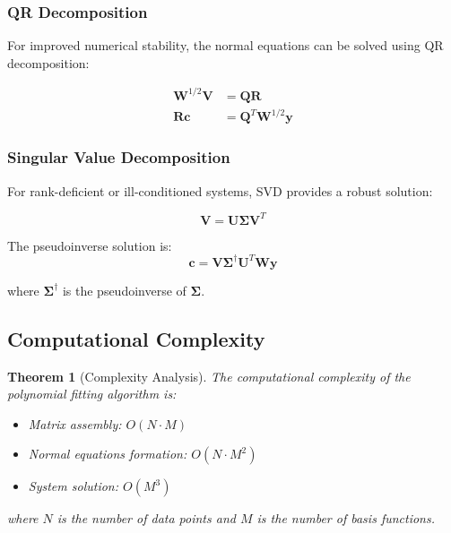 \documentclass[12pt]{article}
\renewcommand{\vec}[1]{\mathbf{#1}}
\newtheorem{theorem}{Theorem}[section]
\begin{document}
\subsubsection{QR Decomposition}

For improved numerical stability, the normal equations can be solved using QR decomposition:

\begin{align}
    \mathbf{W}^{1/2} \mathbf{V} & = \mathbf{Q} \mathbf{R}                 \\
    \mathbf{R} \vec{c}          & = \mathbf{Q}^T \mathbf{W}^{1/2} \vec{y}
\end{align}

\subsubsection{Singular Value Decomposition}

For rank-deficient or ill-conditioned systems, SVD provides a robust solution:

\begin{equation}
    \mathbf{V} = \mathbf{U} \mathbf{\Sigma} \mathbf{V}^T
\end{equation}

The pseudoinverse solution is:
\begin{equation}
    \vec{c} = \mathbf{V} \mathbf{\Sigma}^{\dagger} \mathbf{U}^T \mathbf{W} \vec{y}
\end{equation}

where $\mathbf{\Sigma}^{\dagger}$ is the pseudoinverse of $\mathbf{\Sigma}$.

\subsection{Computational Complexity}

\begin{theorem}[Complexity Analysis]
    The computational complexity of the polynomial fitting algorithm is:
    \begin{itemize}
        \item Matrix assembly: $O(N \cdot M)$
        \item Normal equations formation: $O(N \cdot M^2)$
        \item System solution: $O(M^3)$
    \end{itemize}
    where $N$ is the number of data points and $M$ is the number of basis functions.
\end{theorem}
\end{document}
